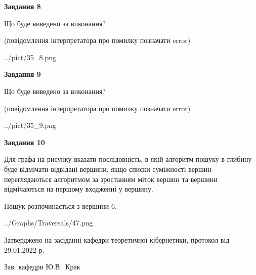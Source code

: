 \documentclass[12pt, ukrainian]{article}
\begin{document}
{\begin {large}
{\begin {center}\textbf{Завдання 8}\end {center}}\par
Що буде виведено за виконання?\par
 (повідомлення інтерпретатора про помилку позначати error)
\begin{center}
	{../pict/35_8.png}
\end{center}
\newpage

{\begin {center}\textbf{Завдання 9}\end {center}}\par
Що буде виведено за виконання?\par
 (повідомлення інтерпретатора про помилку позначати error)\par
\begin{center}
	{../pict/35_9.png}
\end{center}
\newpage

{\begin {center}\textbf{Завдання 10}\end {center}}\par
Для графа на рисунку вказати послідовність, в якій алгоритм пошуку в глибину буде відмічати відвідані вершини, якщо списки суміжності вершин переглядаються алгоритмом за зростанням міток вершин та вершини відмічаються на першому вход\-женні у вершину.\par
Пошук розпочинається з вершини 6.\par

\begin{center}
	{../Graphs/Traversals/47.png}
\end{center}\par
\newpage


\end {large}
}
{\smallskip \begin {small} Затверджено на засіданні кафедри теоретичної кібернетики, протокол  від   29.01.2022 р.\par\smallskip\smallskip
{\parbox {6.5 cm}{Зав. кафедри \dotfill Ю.В.~Крак}} \end{small}}
\end{document}
